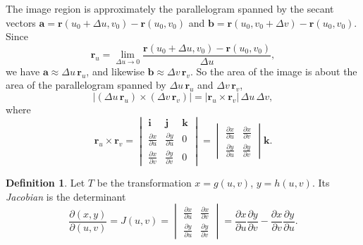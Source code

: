 \documentclass[11pt,a4paper]{article}
\theoremstyle{definition}
\newtheorem{defn}[thm]{Definition}
\begin{document}
\begin{figure}[H]
\centering
{}
\end{figure}

The image region is approximately the parallelogram spanned by the secant
vectors $\mathbf a = \mathbf r(u_0 + \Delta u, v_0) - \mathbf r(u_0,v_0)$ and
$\mathbf b = \mathbf r(u_0, v_0 + \Delta v) - \mathbf r(u_0,v_0)$. Since
\[\mathbf r_u = \lim_{\Delta u \to 0} \frac{\mathbf r(u_0 + \Delta u, v_0) -
\mathbf r(u_0,v_0)}{\Delta u},\]
we have $\mathbf a\approx\Delta u\,\mathbf r_u$, and likewise
$\mathbf b\approx \Delta v\,\mathbf r_v$. So the area of the image is about the
area of the parallelogram spanned by $\Delta u\,\mathbf r_u$ and
$\Delta v\,\mathbf r_v$,
\[|(\Delta u\,\mathbf r_u) \times (\Delta v\,\mathbf r_v)| = |\mathbf r_u \times
\mathbf r_v|\,\Delta u \,\Delta v ,\]
where
\[\mathbf r_u \times \mathbf r_v = \begin{vmatrix}
\mathbf i & \mathbf j & \mathbf k\\[1ex]
\frac{\partial x}{\partial u} & \frac{\partial y}{\partial u} & 0\\[1ex]
\frac{\partial x}{\partial v} & \frac{\partial y}{\partial v} & 0
\end{vmatrix} = \begin{vmatrix}
\frac{\partial x}{\partial u} & \frac{\partial x}{\partial v}\\[1ex]
\frac{\partial y}{\partial u} & \frac{\partial y}{\partial v}
\end{vmatrix}\mathbf k .\]

\begin{defn}
\label{defn:jacobiantransform}
Let $T$ be the transformation $x = g(u,v)$, $y = h(u,v)$. Its \emph{Jacobian} is
the determinant
\[\frac{\partial (x,y)}{\partial (u,v)} = J(u,v) =
\begin{vmatrix}
\frac{\partial x}{\partial u} & \frac{\partial x}{\partial v}\\[1ex]
\frac{\partial y}{\partial u} & \frac{\partial y}{\partial v}
\end{vmatrix} = \frac{\partial x}{\partial u}\frac{\partial y}{\partial v} -
\frac{\partial x}{\partial v}\frac{\partial y}{\partial u} .\]
\end{defn}
\end{document}
